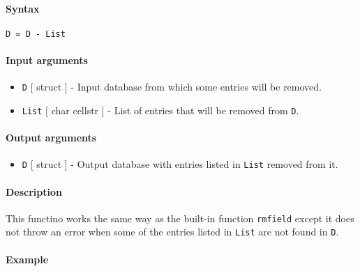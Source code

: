 


	\paragraph{Syntax}\label{syntax}

\begin{verbatim}
D = D - List
\end{verbatim}

\paragraph{Input arguments}\label{input-arguments}

\begin{itemize}
\item
  \texttt{D} {[} struct {]} - Input database from which some entries
  will be removed.
\item
  \texttt{List} {[} char \textbar{} cellstr {]} - List of entries that
  will be removed from \texttt{D}.
\end{itemize}

\paragraph{Output arguments}\label{output-arguments}

\begin{itemize}
\itemsep1pt\parskip0pt
\item
  \texttt{D} {[} struct {]} - Output database with entries listed in
  \texttt{List} removed from it.
\end{itemize}

\paragraph{Description}\label{description}

This functino works the same way as the built-in function
\texttt{rmfield} except it does not throw an error when some of the
entries listed in \texttt{List} are not found in \texttt{D}.

\paragraph{Example}\label{example}


